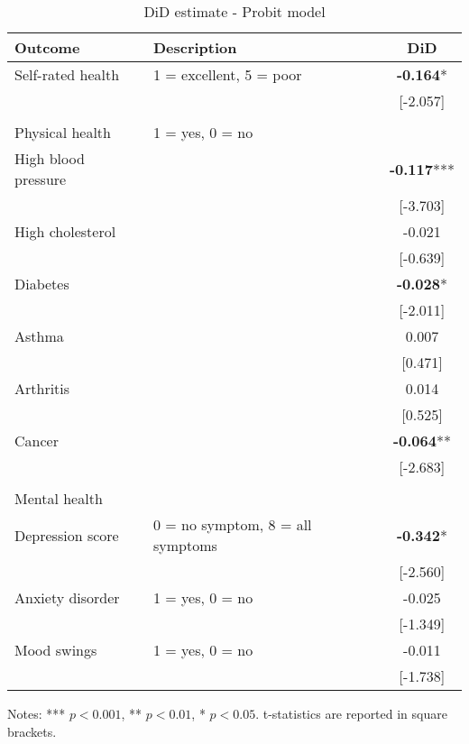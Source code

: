 \begin{table}[h!]
    \centering
    \caption{DiD estimate - Probit model}
    \label{app:did_probit}
    \begin{threeparttable}
        \begin{tabular}{llc}
            \toprule
            Outcome & Description & DiD \\
            \midrule
            Self-rated health & 1 = excellent, 5 = poor & \textbf{-0.164}* \\
            &  & [-2.057] \\
            & & \\
            Physical health & 1 = yes, 0 = no & \\
            High blood pressure &  & \textbf{-0.117}*** \\
            &  & [-3.703] \\
            High cholesterol &  & -0.021 \\
            &  & [-0.639] \\
            Diabetes &  & \textbf{-0.028}* \\
            &  & [-2.011] \\
            Asthma &  & 0.007 \\
            &  & [0.471] \\
            Arthritis &  & 0.014 \\
            &  & [0.525] \\
            Cancer &  & \textbf{-0.064}** \\
            &  & [-2.683] \\
            & & \\
            Mental health & & \\
            Depression score & 0 = no symptom, 8 = all symptoms & \textbf{-0.342}* \\
            &  & [-2.560] \\
            Anxiety disorder & 1 = yes, 0 = no & -0.025 \\
            &  & [-1.349] \\
            Mood swings & 1 = yes, 0 = no & -0.011 \\
            &  & [-1.738] \\
            \bottomrule
        \end{tabular}
        \begin{tablenotes}
            \footnotesize
            \item Notes: *** $p < 0.001$, ** $p < 0.01$, * $p < 0.05$. t-statistics are reported in square brackets.
        \end{tablenotes}
    \end{threeparttable}
\end{table}


